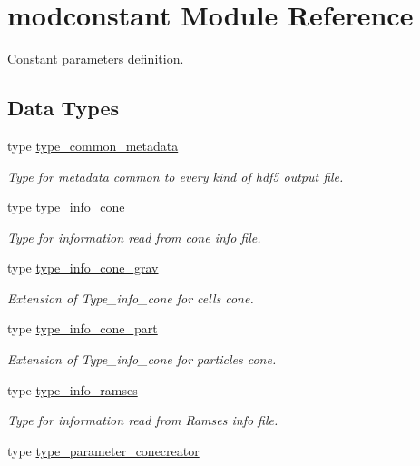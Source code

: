\hypertarget{classmodconstant}{\section{modconstant Module Reference}
\label{classmodconstant}
}


Constant parameters definition.  


\subsection*{Data Types}
\begin{DoxyCompactItemize}
\item 
type \hyperlink{structmodconstant_1_1type__common__metadata}{type\-\_\-common\-\_\-metadata}
\begin{DoxyCompactList}\small\item\em Type for metadata common to every kind of hdf5 output file. \end{DoxyCompactList}\item 
type \hyperlink{structmodconstant_1_1type__info__cone}{type\-\_\-info\-\_\-cone}
\begin{DoxyCompactList}\small\item\em Type for information read from cone info file. \end{DoxyCompactList}\item 
type \hyperlink{structmodconstant_1_1type__info__cone__grav}{type\-\_\-info\-\_\-cone\-\_\-grav}
\begin{DoxyCompactList}\small\item\em Extension of Type\-\_\-info\-\_\-cone for cells cone. \end{DoxyCompactList}\item 
type \hyperlink{structmodconstant_1_1type__info__cone__part}{type\-\_\-info\-\_\-cone\-\_\-part}
\begin{DoxyCompactList}\small\item\em Extension of Type\-\_\-info\-\_\-cone for particles cone. \end{DoxyCompactList}\item 
type \hyperlink{structmodconstant_1_1type__info__ramses}{type\-\_\-info\-\_\-ramses}
\begin{DoxyCompactList}\small\item\em Type for information read from Ramses info file. \end{DoxyCompactList}\item 
type \hyperlink{structmodconstant_1_1type__parameter__conecreator}{type\-\_\-parameter\-\_\-conecreator}

\end{DoxyCompactItemize}
